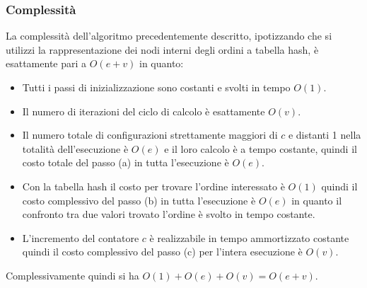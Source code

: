 \subsubsection{Complessità}
La complessità dell'algoritmo precedentemente descritto, ipotizzando
che si utilizzi la rappresentazione dei nodi interni degli ordini a
tabella hash, è esattamente pari a $O(e + v)$ in quanto:
\begin{itemize}
\item Tutti i passi di inizializzazione sono costanti e svolti in
  tempo $O(1)$.
\item Il numero di iterazioni del ciclo di calcolo è esattamente
  $O(v)$.
\item Il numero totale di configurazioni strettamente maggiori di $c$
  e distanti 1 nella totalità dell'esecuzione è $O(e)$ e il loro
  calcolo è a tempo costante, quindi il costo totale del passo (a) in
  tutta l'esecuzione è $O(e)$.
\item Con la tabella hash il costo per trovare l'ordine interessato è
  $O(1)$ quindi il costo complessivo del passo (b) in tutta
  l'esecuzione è $O(e)$ in quanto il confronto tra due valori trovato
  l'ordine è svolto in tempo costante.
\item L'incremento del contatore $c$ è realizzabile in tempo
  ammortizzato costante quindi il costo complessivo del passo (c) per l'intera
  esecuzione è $O(v)$.
\end{itemize}

Complessivamente quindi si ha $O(1) + O(e) + O(v)= O(e+v)$.

